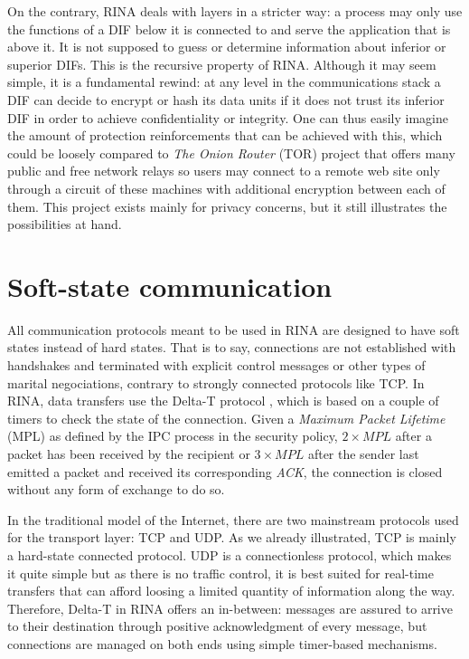 \documentclass[a4paper]{proc}
\begin{document}
On the contrary, RINA deals with layers in a stricter way: a process may only
use the functions of a DIF below it is connected to and serve the application
that is above it. It is not supposed to guess or determine information about
inferior or superior DIFs. This is the recursive property of RINA. Although it
may seem simple, it is a fundamental rewind: at any level in the communications
stack a DIF can decide to encrypt or hash its data units if it does not trust
its inferior DIF in order to achieve confidentiality or integrity. One can thus
easily imagine the amount of protection reinforcements that can be achieved with
this, which could be loosely compared to \textit{The Onion Router} (TOR) project
that offers many public and free network relays so users may connect to a remote
web site only through a circuit of these machines with additional encryption
between each of them. This project exists mainly for privacy concerns, but it
still illustrates the possibilities at hand.

\section{Soft-state communication}

All communication protocols meant to be used in RINA are designed to have soft
states instead of hard states. That is to say, connections are not established
with handshakes and terminated with explicit control messages or other types of
marital negociations, contrary to strongly connected protocols like TCP. In
RINA, data transfers use the Delta-T protocol \cite{delta-t}, which is based on
a couple of timers to check the state of the connection. Given a \textit{Maximum
Packet Lifetime} (MPL) as defined by the IPC process in the security policy, $2
\times MPL$ after a packet has been received by the recipient or $3 \times MPL$
after the sender last emitted a packet and received its corresponding
\textit{ACK}, the connection is closed without any form of exchange to do so.

In the traditional model of the Internet, there are two mainstream protocols
used for the transport layer: TCP and UDP. As we already illustrated, TCP is
mainly a hard-state connected protocol. UDP is a connectionless protocol, which
makes it quite simple but as there is no traffic control, it is best suited for
real-time transfers that can afford loosing a limited quantity of information
along the way. Therefore, Delta-T in RINA offers an in-between: messages are
assured to arrive to their destination through positive acknowledgment of every
message, but connections are managed on both ends using simple timer-based
mechanisms.
\end{document}
